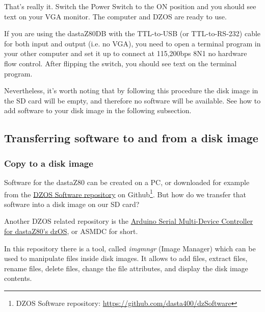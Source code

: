 That’s really it. Switch the Power Switch to the ON position and you should see
text on your VGA monitor. The computer and DZOS are ready to use.

If you are using the dastaZ80DB with the TTL-to-USB (or TTL-to-RS-232) cable for
both input and output (i.e. no VGA), you need to open a terminal program in your
other computer and set it up to connect at 115,200bps 8N1 no hardware flow
control. After flipping the switch, you should see text on the terminal program.

Nevertheless, it's worth noting that by following this procedure the disk
image in the SD card will be empty, and therefore no software will be
available. See how to add software to your disk image in the following
subsection.

    \subsection{Transferring software to and from a disk image}

        \subsubsection{Copy to a disk image}

        Software for the dastaZ80 can be created on a PC, or downloaded for example
        from the \href{https://github.com/dasta400/dzSoftware}{DZOS Software repository}
        on Github\footnote{DZOS Software repository: 
        \url{https://github.com/dasta400/dzSoftware}}. But how do we transfer that
        software into a disk image on our SD card?

        Another DZOS related repository is the \href{https://github.com/dasta400/asmdc}
        {Arduino Serial Multi-Device Controller for dastaZ80's dzOS}, or ASMDC for
        short.

        In this repository there is a tool, called \textit{imgmngr} (Image Manager)
        which can be used to manipulate files inside disk images. It allows to add
        files, extract files, rename files, delete files, change the file attributes,
        and display the disk image contents.

